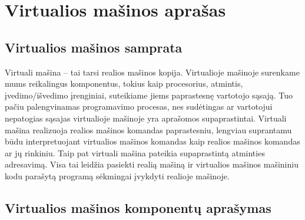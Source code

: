 \section{Virtualios mašinos aprašas}

\subsection{Virtualios mašinos samprata}

Virtuali mašina – tai tarsi realios mašinos kopija. Virtualioje mašinoje
surenkame mums reikalingus komponentus, tokius kaip procesorius,
atmintis, įvedimo/išvedimo įrenginiai, suteikiame jiems paprastesnę
vartotojo sąsają. Tuo pačiu palengvinamas programavimo procesas,
nes sudėtingas ar vartotojui nepatogias sąsajas virtualioje mašinoje yra 
aprašomos supaprastintai. Virtuali mašina realizuoja realios mašinos
komandas paprastesniu, lengviau suprantamu būdu interpretuojant virtualios
mašinos komandas kaip realios mašinos komandas ar jų rinkiniu. Taip pat 
virtuali mašina pateikia supaprastintą atminties adresavimą. Visa tai 
leidžia pasiekti realią mašiną ir virtualios mašinos mašininiu kodu 
parašytą programą sėkmingai įvykdyti realioje mašinoje. 

\subsection{Virtualios mašinos komponentų aprašymas}

